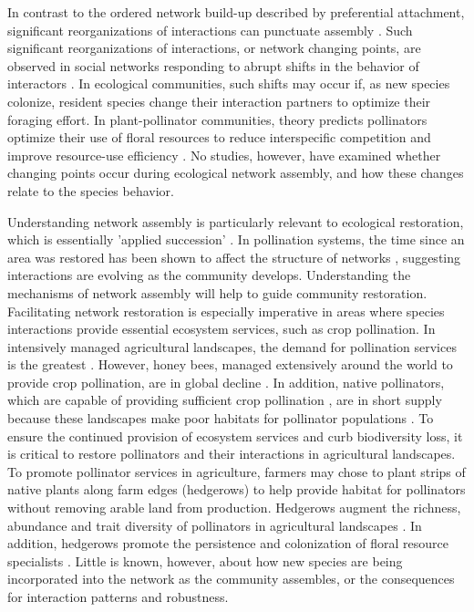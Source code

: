 \documentclass[12pt]{article}
\begin{document}
In contrast to the ordered network build-up described by preferential
attachment, significant reorganizations of interactions can punctuate
assembly \citep{peel2014detecting}. Such significant reorganizations
of interactions, or network changing points, are observed in social
networks responding to abrupt shifts in the behavior of interactors
\citep{peel2014detecting}. In ecological communities, such shifts may
occur if, as new species colonize, resident species change their
interaction partners to optimize their foraging effort. In
plant-pollinator communities, theory predicts pollinators optimize
their use of floral resources to reduce interspecific competition and
improve resource-use efficiency \citep{pyke1984optimal,
  valdovinos2010consequences, valdovinos2013adaptive,
  albrecht2010plant, Bluthgen2007}. No studies, however, have examined
whether changing points occur during ecological network assembly, and
how these changes relate to the species behavior.

Understanding network assembly is particularly relevant to ecological
restoration, which is essentially 'applied succession'
\citep[e.g.,][]{parker1997scale}. In pollination systems, the time
since an area was restored has been shown to affect the structure of
networks \citep{forup-2008-742, forup2008restoration,
  devoto2012understanding}, suggesting interactions are evolving as
the community develops. Understanding the mechanisms of network
assembly will help to guide community restoration. Facilitating
network restoration is especially imperative in areas where species
interactions provide essential ecosystem services, such as crop
pollination. In intensively managed agricultural landscapes, the
demand for pollination services is the greatest
\citep{kremen-2008-10}. However, honey bees, managed extensively
around the world to provide crop pollination, are in global decline
\citep{neumann-2010-1, van-engelsdorp-2009-e6481}. In addition, native
pollinators, which are capable of providing sufficient crop
pollination \citep{kremen-2002-16816, winfree-2007-1105,
  kremen-2004-1109}, are in short supply because these landscapes make
poor habitats for pollinator populations \citep{kremen-2002-16816}. To
ensure the continued provision of ecosystem services and curb
biodiversity loss, it is critical to restore pollinators and their
interactions in agricultural landscapes. To promote pollinator
services in agriculture, farmers may chose to plant strips of native
plants along farm edges (hedgerows) to help provide habitat for
pollinators without removing arable land from production. Hedgerows
augment the richness, abundance and trait diversity of pollinators in
agricultural landscapes \citep{morandin-2013-829, mgonigle-2015-x,
  kremen-2015-602, ponisio2015farm}. In addition, hedgerows promote
the persistence and colonization of floral resource specialists
\citep{mgonigle-2015-x}. Little is known, however, about how new
species are being incorporated into the network as the community
assembles, or the consequences for interaction patterns and
robustness.
\end{document}
